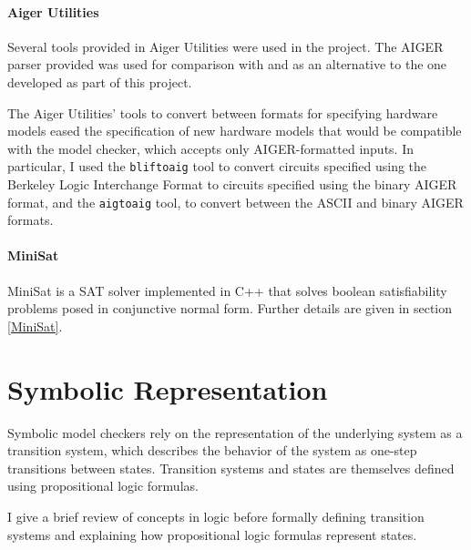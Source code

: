 \documentclass[12pt,a4paper,twoside,openright]{report}
\begin{document}
\paragraph{Aiger Utilities}{
Several tools provided in Aiger Utilities were used in the project. The
AIGER parser provided was used for comparison with and as an alternative
to the one developed as part of this project. 

The Aiger Utilities' tools to convert between formats for specifying
hardware models eased the specification of new hardware models that would
be compatible with the model checker, which accepts only AIGER-formatted inputs.
In particular, I used the {\tt bliftoaig}
tool to convert circuits specified using the Berkeley Logic Interchange Format
to circuits specified using the binary AIGER format, and the {\tt aigtoaig} tool,
to convert between the ASCII and binary AIGER formats. }

\paragraph{MiniSat}{
MiniSat is a SAT solver implemented in C++ that solves boolean satisfiability problems
posed in conjunctive normal form. Further details are given in section \ref{MiniSat}.
}

\section{Symbolic Representation}
\label{logic}

Symbolic model checkers rely on the representation of the underlying system as a
transition system, which describes the behavior of the system as one-step transitions
between states. Transition systems and states are themselves defined using
propositional logic formulas.

I give a brief review of concepts in logic before formally defining transition systems
and explaining how propositional logic formulas represent states.
\end{document}
